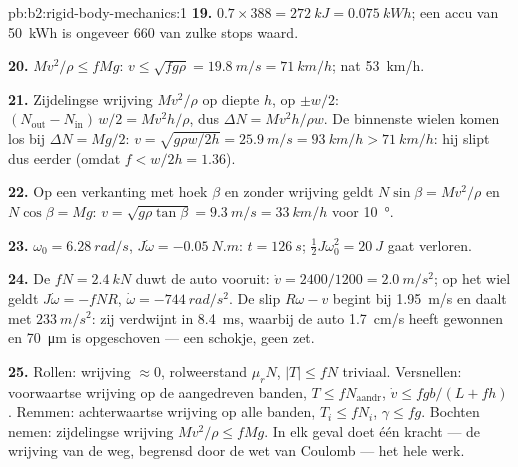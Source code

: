 \begin{solution}{pb:b2:rigid-body-mechanics:1}
\textbf{19.} $0.7 \times 388 = \qty{272}{kJ} = \qty{0.075}{kWh}$; een accu
van \qty{50}{kWh} is ongeveer $660$ van zulke stops waard.

\textbf{20.} $Mv^2/\rho \le fMg$:
$v \le \sqrt{fg\rho} = \qty{19.8}{m/s} =
\qty{71}{km/h}$; nat
\qty{53}{km/h}.

\textbf{21.} Zijdelingse wrijving $Mv^2/\rho$ op diepte $h$, 
op $\pm w/2$: $(N_{\text{out}} - N_{\text{in}})\,w/2 = Mv^2h/\rho$, dus
$\Delta N =
Mv^2h/\rho w$. De binnenste wielen komen los bij
$\Delta N = Mg/2$:
$v = \sqrt{g\rho w/2h} =
\qty{25.9}{m/s} = \qty{93}{km/h} > \qty{71}{km/h}$:
hij slipt dus eerder (omdat $f <
w/2h = 1.36$).

\textbf{22.} Op een verkanting met hoek $\beta$ en zonder wrijving geldt
$N\sin\beta =
Mv^2/\rho$ en $N\cos\beta = Mg$:
$v = \sqrt{g\rho\tan\beta} = \qty{9.3}{m/s} =
\qty{33}{km/h}$ voor
\qty{10}{\degree}.

\textbf{23.} $\omega_0 = \qty{6.28}{rad/s}$,
$J\dot\omega = \qty{-0.05}{N.m}$: $t =
\qty{126}{s}$;
$\tfrac12J\omega_0^2 = \qty{20}{J}$ gaat verloren.

\textbf{24.} De  $fN = \qty{2.4}{kN}$ duwt de auto
vooruit: $\dot v = 2400/1200 = \qty{2.0}{m/s^2}$; op het wiel geldt
$J\dot\omega = -fNR$, $\dot\omega = \qty{-744}{rad/s^2}$. De slip
$R\omega - v$ begint bij \qty{1.95}{m/s} en daalt met $\qty{233}{m/s^2}$:
zij verdwijnt in \qty{8.4}{ms}, waarbij de auto \qty{1.7}{cm/s} heeft
gewonnen en \qty{70}{\micro m} is opgeschoven --- een schokje, geen zet.

\textbf{25.} Rollen: wrijving $\approx 0$, rolweerstand $\mu_rN$,
$|T| \le fN$ triviaal. Versnellen: voorwaartse wrijving op de aangedreven
banden, $T \le fN_{\text{aandr}}$, $\dot v \le fgb/(L + fh)$. Remmen:
achterwaartse wrijving op alle banden, $T_i \le fN_i$, $\gamma \le fg$.
Bochten nemen: zijdelingse wrijving $Mv^2/\rho \le fMg$. In elk geval doet
één kracht --- de wrijving van de weg, begrensd door de wet van Coulomb ---
het hele werk.
\end{solution}
